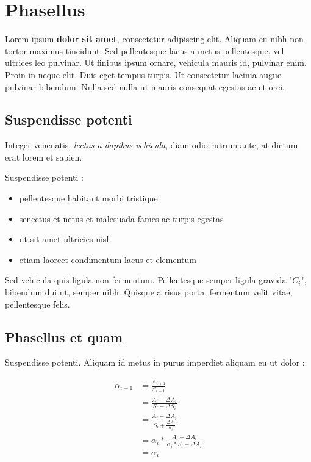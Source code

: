 \section{Phasellus} \label{sec:phasellus}

Lorem ipsum \textbf{dolor sit amet}, consectetur adipiscing elit. Aliquam eu nibh non
tortor maximus tincidunt. Sed pellentesque lacus a metus pellentesque, vel
ultrices leo pulvinar. Ut finibus ipsum ornare, vehicula mauris id, pulvinar
enim. Proin in neque elit. Duis eget tempus turpis. Ut consectetur lacinia
augue pulvinar bibendum. Nulla sed nulla ut mauris consequat egestas ac et orci.

\subsection{Suspendisse potenti}

Integer venenatis, \textit{lectus a dapibus vehicula}, diam odio rutrum ante, at dictum
erat lorem et sapien.

Suspendisse potenti :

\begin{itemize}
\item{pellentesque habitant morbi tristique}
\item{senectus et netus et malesuada fames ac turpis egestas}
\item{ut sit amet ultricies nisl}
\item{etiam laoreet condimentum lacus et elementum}
\end{itemize}

Sed vehicula quis ligula non fermentum. Pellentesque semper ligula gravida "$C_i$",
bibendum dui ut, semper nibh. Quisque a risus porta, fermentum velit vitae,
pellentesque felis.

\newpage
\subsection{Phasellus et quam}

Suspendisse potenti. Aliquam id metus in purus imperdiet aliquam eu ut dolor :

\begin{highlight}
\begin{align}
\alpha_{i+1} &= \frac{A_{i+1}}{S_{i+1}} \\
             &= \frac{A_i + \Delta A_i}{S_i + \Delta S_i} \\
             &= \frac{A_i + \Delta A_i}{S_i + \frac{\Delta A_i}{\alpha_i}} \\
             &= \alpha_i * \frac{A_i + \Delta A_i}{\alpha_i * S_i + \Delta A_i} \\
             &= \alpha_i
\end{align}
\end{highlight}

